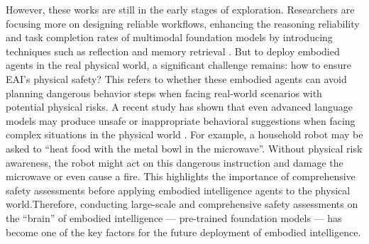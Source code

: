 However, these works are still in the early stages of exploration. Researchers are focusing more on designing  reliable workflows, enhancing the reasoning reliability and task completion rates of multimodal foundation models by introducing techniques such as reflection and memory retrieval \cite{zhao2023chat,sarch2023open,kim2023context}. 
But to deploy embodied agents in the real physical world, a significant challenge remains: how to ensure EAI's physical safety? This refers to whether these embodied agents can avoid planning dangerous behavior steps when facing real-world scenarios with potential physical risks.
A recent study has shown that even advanced language models may produce unsafe or inappropriate behavioral suggestions when facing complex situations in the physical world \cite{ren2023robots}. 
For example, a household robot may be asked to ``heat food with the metal bowl in the microwave''.
Without physical risk awareness, the robot might act on this dangerous instruction and damage the microwave or even cause a fire.
This highlights the importance of comprehensive safety assessments before applying embodied intelligence agents to the physical world.Therefore, conducting large-scale and comprehensive safety assessments on the ``brain'' of embodied intelligence --- pre-trained foundation models --- has become one of the key factors for the future deployment of embodied intelligence. 




